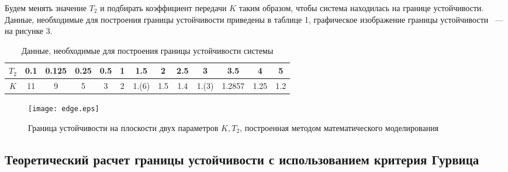 \documentclass[12pt,a4paper]{article}
\begin{document}
Будем менять значение $T_2$ и подбирать коэффициент передачи $K$ таким образом, чтобы система находилась на границе устойчивости. Данные, необходимые для построения границы устойчивости приведены в таблице 1, графическое изображение границы устойчивости ~--- на рисунке 3.
\begin{table}[h!]
	\caption{Данные, необходимые для построения границы устойчивости системы}
	\renewcommand{\arraystretch}{1.8} %
	\begin{tabular}{|c|c|c|c|c|c|c|c|c|c|c|c|c|}
		\hline $T_2$ & 0.1 & 0.125 & 0.25 & 0.5 & 1 & 1.5 & 2 & 2.5 & 3 & 3.5 & 4 & 5\\
		\hline $K$ & 11 & 9 & 5 & 3 & 2 & 1.(6) & 1.5 & 1.4 & 1.(3) & 1.2857 & 1.25 & 1.2\\
		\hline
	\end{tabular}	
\end{table} 
\begin{figure}[h!]
	\centering
	\texttt{[image: edge.eps]}
	\caption{Граница устойчивости на плоскости двух параметров $K, T_2$, построенная методом математического моделирования}
\end{figure}

\newpage
\begin{center}
    \section{Теоретический расчет границы устойчивости с использованием критерия Гурвица}
\end{center}
 
\end{document}
